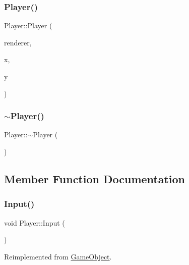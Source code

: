 \subsubsection{\texorpdfstring{Player()}{Player()}}
{\footnotesize\ttfamily Player\+::\+Player (\begin{DoxyParamCaption}\item[{S\+D\+L\+\_\+\+Renderer $\ast$}]{renderer,  }\item[{int}]{x,  }\item[{int}]{y }\end{DoxyParamCaption})}

\mbox{\label{class_player_a749d2c00e1fe0f5c2746f7505a58c062}} 
\subsubsection{\texorpdfstring{$\sim$\+Player()}{~Player()}}
{\footnotesize\ttfamily Player\+::$\sim$\+Player (\begin{DoxyParamCaption}{ }\end{DoxyParamCaption})}



\subsection{Member Function Documentation}
\mbox{\label{class_player_a65a76094cff6f149d5847d2110fe443d}} 
\subsubsection{\texorpdfstring{Input()}{Input()}}
{\footnotesize\ttfamily void Player\+::\+Input (\begin{DoxyParamCaption}{ }\end{DoxyParamCaption})\hspace{0.3cm}{\ttfamily [virtual]}}



Reimplemented from \mbox{\hyperlink{class_game_object_a430742cf91abb99337c556c88bef880a}{Game\+Object}}.

\mbox{\label{class_player_ae30c8d49de94ee8c73ed6ab6315a2854}} 
